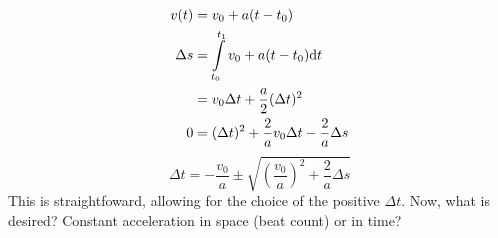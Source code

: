 \documentclass[12pt]{article}
\newcommand\de[0]{\text d}
\newcommand\gkl[1]{\left( #1 \right)}
\begin{document}
\begin{equation}
\begin{aligned}
v(t) &= v_0 + a(t - t_0)
\\
\Delta s &= \int\limits_{t_0}^{t_1} v_0 + a(t - t_0) \de t
\\
&= v_0 \Delta t + \frac a2 (\Delta t)^2
\\
0 &= (\Delta t)^2 + \frac 2a v_0 \Delta t - \frac 2a \Delta s
\end{aligned}
\end{equation}
\begin{equation}
\Delta t = - \frac {v_0}a \pm \sqrt{ \gkl{\frac{v_0}a}^2 + \frac 2a \Delta s }
\end{equation}
This is straightfoward, allowing for the choice of the positive $\Delta t$.
Now, what is desired? Constant acceleration in space (beat count) or in time?
\end{document}
